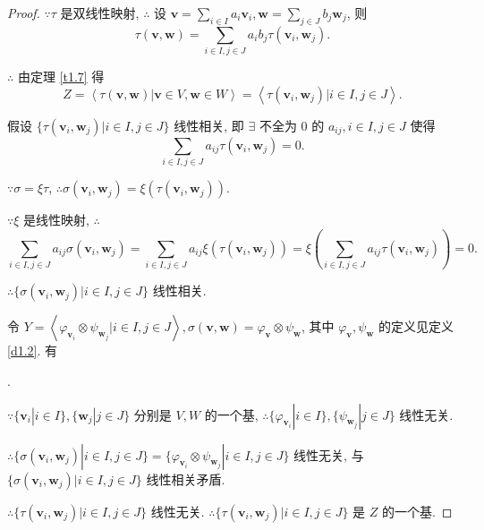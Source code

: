 \documentclass{ctexart}
\begin{document}
\begin{proof}
    $\because\tau$ 是双线性映射, $\therefore$ 设 $\boldsymbol{v}=\sum\limits_{i\in I}a_i\boldsymbol{v}_i,\boldsymbol{w}=\sum\limits_{j\in J}b_j\boldsymbol{w}_j$, 则
    \[\tau(\boldsymbol{v},\boldsymbol{w})=\sum\limits_{i\in I,j\in J}a_ib_j\tau(\boldsymbol{v}_i,\boldsymbol{w}_j).\]
    
    $\therefore$ 由定理 \ref{t1.7} 得
    \[Z=\left<\tau(\boldsymbol{v},\boldsymbol{w})|\boldsymbol{v}\in V,\boldsymbol{w}\in W\right>=\left<\tau(\boldsymbol{v}_i,\boldsymbol{w}_j)|i\in I,j\in J\right>.\]

    假设 $\{\tau(\boldsymbol{v}_i,\boldsymbol{w}_j)|i\in I,j\in J\}$ 线性相关, 即 $\exists$ 不全为 $0$ 的 $a_{ij},i\in I,j\in J$ 使得
    \[\sum\limits_{i\in I,j\in J}a_{ij}\tau(\boldsymbol{v}_i,\boldsymbol{w}_j)=0.\]

    $\because\sigma=\xi\tau$, $\therefore\sigma(\boldsymbol{v}_i,\boldsymbol{w}_j)=\xi(\tau(\boldsymbol{v}_i,\boldsymbol{w}_j))$.

    $\because\xi$ 是线性映射, $\therefore$
    \[\sum\limits_{i\in I,j\in J}a_{ij}\sigma(\boldsymbol{v}_i,\boldsymbol{w}_j)=\sum\limits_{i\in I,j\in J}a_{ij}\xi(\tau(\boldsymbol{v}_i,\boldsymbol{w}_j))=\xi\left(\sum\limits_{i\in I,j\in J}a_{ij}\tau(\boldsymbol{v}_i,\boldsymbol{w}_j)\right)=0.\]

    $\therefore\{\sigma(\boldsymbol{v}_i,\boldsymbol{w}_j)|i\in I,j\in J\}$ 线性相关.
    
    令 $Y=\left<\varphi_{\boldsymbol{v}_i}\otimes\psi_{\boldsymbol{w}_j}|i\in I,j\in J\right>,\sigma(\boldsymbol{v},\boldsymbol{w})=\varphi_{\boldsymbol{v}}\otimes\psi_{\boldsymbol{w}}$, 其中 $\varphi_{\boldsymbol{v}},\psi_{\boldsymbol{w}}$ 的定义见定义 \ref{d1.2}. 有
    \begin{center}
        .
    \end{center}

    $\because\{\boldsymbol{v}_i|i\in I\},\{\boldsymbol{w}_j|j\in J\}$ 分别是 $V,W$ 的一个基, $\therefore\{\varphi_{\boldsymbol{v}_i}|i\in I\},\{\psi_{\boldsymbol{w}_j}|j\in J\}$ 线性无关.
    
    $\therefore\{\sigma(\boldsymbol{v}_i,\boldsymbol{w}_j)|i\in I,j\in J\}=\{\varphi_{\boldsymbol{v}_i}\otimes\psi_{\boldsymbol{w}_j}|i\in I,j\in J\}$ 线性无关, 与 $\{\sigma(\boldsymbol{v}_i,\boldsymbol{w}_j)|i\in I,j\in J\}$ 线性相关矛盾.

    $\therefore\{\tau(\boldsymbol{v}_i,\boldsymbol{w}_j)|i\in I,j\in J\}$ 线性无关. $\therefore\{\tau(\boldsymbol{v}_i,\boldsymbol{w}_j)|i\in I,j\in J\}$ 是 $Z$ 的一个基.
\end{proof}
\end{document}
